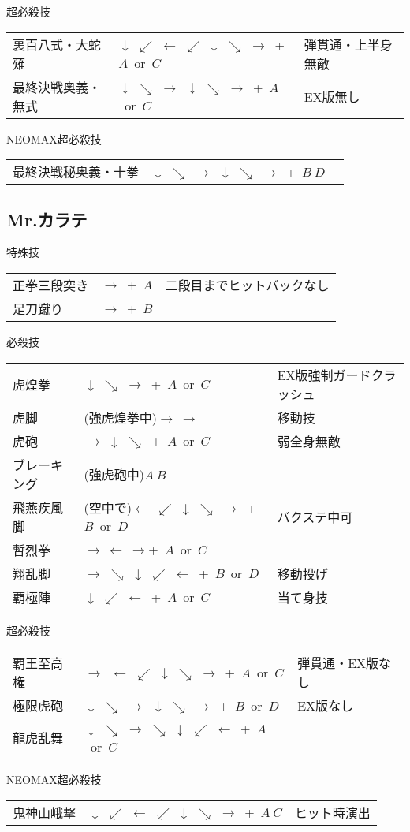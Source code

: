 \documentclass[a4j,11pt]{jarticle}
\def\zanretu{$\rightarrow\ \leftarrow\ \rightarrow$}
\def\hado{$\downarrow$ $\searrow$ $\rightarrow$}%
\def\tatsu{$\downarrow$ $\swarrow$ $\leftarrow$}%
\def\syoryu{$\rightarrow$ $\downarrow$ $\searrow$}%
\def\yoga{$\leftarrow$ $\swarrow$ $\downarrow$ $\searrow$ $\rightarrow$}%
\def\gyakuyoga{$\rightarrow$ $\searrow$ $\downarrow$ $\swarrow$ $\leftarrow$}%
\def\ryuko{$\downarrow$ $\searrow$ $\rightarrow$ $\searrow$ $\downarrow$ $\swarrow$ $\leftarrow$}%
\def\orochi{$\downarrow$ $\swarrow$ $\leftarrow$ $\swarrow$ $\downarrow$ $\searrow$ $\rightarrow$}%
\begin{document}
\begin{itembox}[l]{超必殺技}
\begin{tabular}{lll}
裏百八式・大蛇薙&\orochi\ +\ $A$\ or\ $C$&弾貫通・上半身無敵\\%
最終決戦奥義・無式&\hado\ \hado\ +\ $A$\ or\ $C$&EX版無し%
\end{tabular}
\end{itembox}
\begin{itembox}[l]{NEOMAX超必殺技}
\begin{tabular}{lll}
最終決戦秘奥義・十拳&\hado\ \hado\ +\ $B\ D$&%
\end{tabular}
\end{itembox}
\newpage
\subsection{Mr.カラテ}
\begin{itembox}[l]{特殊技}
\begin{tabular}{lll}
正拳三段突き&$\rightarrow$\ +\ $A$&二段目までヒットバックなし\\%
足刀蹴り&$\rightarrow$\ +\ $B$&%
\end{tabular}
\end{itembox}
\begin{itembox}[l]{必殺技}
\begin{tabular}{lll}
虎煌拳&\hado\ +\ $A$\ or\ $C$&EX版強制ガードクラッシュ\\%
虎脚&(強虎煌拳中)$\rightarrow\ \rightarrow$&移動技\\%
虎砲&\syoryu\ +\ $A$\ or\ $C$&弱全身無敵\\%
ブレーキング&(強虎砲中)$A\ B$&\\%
飛燕疾風脚&(空中で)\yoga\ +\ $B$\ or\ $D$&バクステ中可\\%
暫烈拳&\zanretu +\ $A$\ or\ $C$&\\%
翔乱脚&\gyakuyoga\ +\ $B$\ or\ $D$&移動投げ\\%
覇極陣&\tatsu\ +\ $A$\ or\ $C$&当て身技%
\end{tabular}
\end{itembox}
\begin{itembox}[l]{超必殺技}
\begin{tabular}{lll}
覇王至高権&$\rightarrow$\ \yoga\ +\ $A$\ or\ $C$&弾貫通・EX版なし\\%
極限虎砲&\hado\ \hado\ +\ $B$\ or\ $D$&EX版なし\\%
龍虎乱舞&\ryuko\ +\ $A$\ or\ $C$&%
\end{tabular}
\end{itembox}
\begin{itembox}[l]{NEOMAX超必殺技}
\begin{tabular}{lll}
鬼神山峨撃&\orochi\ +\ $A\ C$&ヒット時演出%
\end{tabular}
\end{itembox}
\newpage
\end{document}
